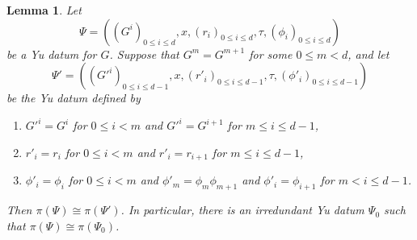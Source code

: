 \documentclass[reqno]{amsart}
\numberwithin{equation}{subsection}
\newtheorem{lemma}[thm]{Lemma}
\theoremstyle{remark}
\numberwithin{equation}{subsection}
\numberwithin{figure}{subsection}
\begin{document}
\begin{lemma}\label{lemma:irredundant-yu-data}
Let 
\[
\Psi = ((G^i)_{0 \leq i \leq d}, x, (r_i)_{0\leq i\leq d}, \tau, (\phi_i)_{0\leq i\leq d})
\]
be a Yu datum for $G$. Suppose that $G^m = G^{m+1}$ for some $0\leq m < d$, and let 
\[
\Psi' = ((G'^i)_{0\leq i\leq d-1}, x, (r'_i)_{0\leq i\leq d-1}, \tau, (\phi'_i)_{0\leq i\leq d-1})
\]
be the Yu datum defined by
\begin{enumerate}
    \item $G'^i = G^i$ for $0\leq i< m$ and $G'^i = G^{i+1}$ for $m\leq i\leq d-1$,
    \item $r'_i = r_i$ for $0\leq i<m$ and $r'_i = r_{i+1}$ for $m\leq i\leq d-1$,
    \item $\phi'_i=\phi_i$ for $0\leq i<m$ and $\phi'_m = \phi_m\phi_{m+1}$ and $\phi'_i = \phi_{i+1}$ for $m < i\leq d-1$.
\end{enumerate}
    Then $\pi(\Psi) \cong \pi(\Psi')$. In particular, there is an irredundant Yu datum $\Psi_0$ such that $\pi(\Psi) \cong \pi(\Psi_0)$.
\end{lemma}
\end{document}
